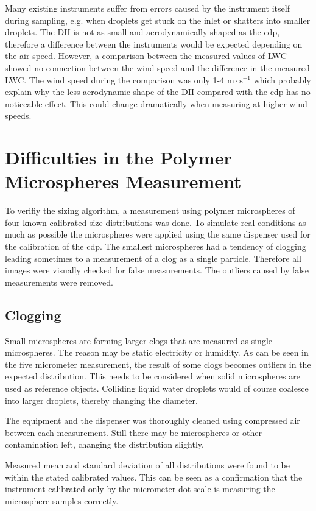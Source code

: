 Many existing instruments suffer from errors caused by the instrument itself during sampling, e.g. when droplets get stuck on the inlet or shatters into smaller droplets. The DII is not as small and aerodynamically shaped as the \gls{cdp}, therefore a difference between the instruments would be expected depending on the air speed. However, a comparison between the measured values of LWC showed no connection between the wind speed and the difference in the measured LWC. The wind speed during the comparison was only 1-4 $\mathrm{m \cdot s^{-1}}$ which probably explain why the less aerodynamic shape of the DII compared with the \gls{cdp} has no noticeable effect. This could change dramatically when measuring at higher wind speeds.

\section{Difficulties in the Polymer Microspheres Measurement}

To verifiy the sizing algorithm, a measurement using polymer microspheres of four known calibrated size distributions was done. To simulate real conditions as much as possible the microspheres were applied using the same dispenser used for the calibration of the \gls{cdp}. The smallest microspheres had a tendency of clogging leading sometimes to a measurement of a clog as a single particle. Therefore all images were visually checked for false measurements. The outliers caused by false measurements were removed.

\subsection{Clogging}

Small microspheres are forming larger clogs that are measured as single microspheres. The reason may be static electricity or humidity. As can be seen in the five micrometer measurement, the result of some clogs becomes outliers in the expected distribution. This needs to be considered when solid microspheres are used as reference objects. Colliding liquid water droplets would of course coalesce into larger droplets, thereby changing the diameter.

The equipment and the dispenser was thoroughly cleaned using compressed air between each measurement. Still there may be microspheres or other contamination left, changing the distribution slightly.

Measured mean and standard deviation of all distributions were found to be within the stated calibrated values. This can be seen as a confirmation that the instrument calibrated only by the micrometer dot scale is measuring the microsphere samples correctly.

